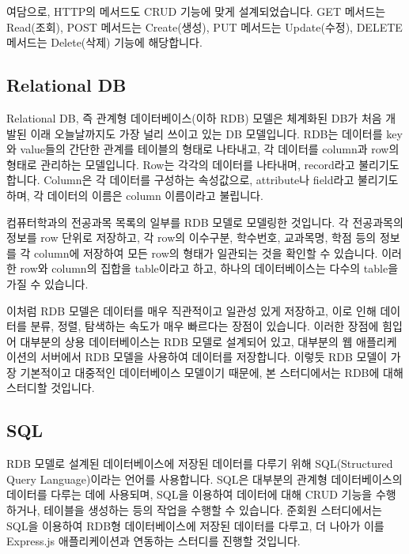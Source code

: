 여담으로, HTTP의 메서드도 CRUD 기능에 맞게 설계되었습니다. GET 메서드는 Read(조회), POST 메서드는 Create(생성), PUT 메서드는 Update(수정), DELETE 메서드는 Delete(삭제) 기능에 해당합니다.

\subsection*{Relational DB}

Relational DB, 즉 관계형 데이터베이스(이하 RDB) 모델은 체계화된 DB가 처음 개발된 이래 오늘날까지도 가장 널리 쓰이고 있는 DB 모델입니다. RDB는 데이터를 key와 value들의 간단한 관계를 테이블의 형태로 나타내고, 각 데이터를 column과 row의 형태로 관리하는 모델입니다. Row는 각각의 데이터를 나타내며, record라고 불리기도 합니다. Column은 각 데이터를 구성하는 속성값으로, attribute나 field라고 불리기도 하며, 각 데이터의 이름은 column 이름이라고 불립니다.


\은 컴퓨터학과의 전공과목 목록의 일부를 RDB 모델로 모델링한 것입니다. 각 전공과목의 정보를 row 단위로 저장하고, 각 row의 이수구분, 학수번호, 교과목명, 학점 등의 정보를 각 column에 저장하여 모든 row의 형태가 일관되는 것을 확인할 수 있습니다. 이러한 row와 column의 집합을 table이라고 하고, 하나의 데이터베이스는 다수의 table을 가질 수 있습니다.

이처럼 RDB 모델은 데이터를 매우 직관적이고 일관성 있게 저장하고, 이로 인해 데이터를 분류, 정렬, 탐색하는 속도가 매우 빠르다는 장점이 있습니다. 이러한 장점에 힘입어 대부분의 상용 데이터베이스는 RDB 모델로 설계되어 있고, 대부분의 웹 애플리케이션의 서버에서 RDB 모델을 사용하여 데이터를 저장합니다. 이렇듯 RDB 모델이 가장 기본적이고 대중적인 데이터베이스 모델이기 때문에, 본 스터디에서는 RDB에 대해 스터디할 것입니다.

\subsection*{SQL}

RDB 모델로 설계된 데이터베이스에 저장된 데이터를 다루기 위해 SQL(Structured Query Language)이라는 언어를 사용합니다. SQL은 대부분의 관계형 데이터베이스의 데이터를 다루는 데에 사용되며, SQL을 이용하여 데이터에 대해 CRUD 기능을 수행하거나, 테이블을 생성하는 등의 작업을 수행할 수 있습니다. 준회원 스터디에서는 SQL을 이용하여 RDB형 데이터베이스에 저장된 데이터를 다루고, 더 나아가 이를 Express.js 애플리케이션과 연동하는 스터디를 진행할 것입니다.
